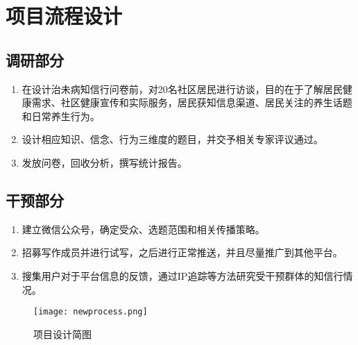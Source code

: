 \section{项目流程设计}
\subsection{调研部分}
\begin{enumerate}
    \item 在设计治未病知信行问卷前，对20名社区居民进行访谈，目的在于了解居民健康需求、社区健康宣传和实际服务，居民获知信息渠道、居民关注的养生话题和日常养生行为。
    \item 设计相应知识、信念、行为三维度的题目，并交予相关专家评议通过。
    \item 发放问卷，回收分析，撰写统计报告。
\end{enumerate}
\subsection{干预部分}
\begin{enumerate}
    \item 建立微信公众号，确定受众、选题范围和相关传播策略。
    \item 招募写作成员并进行试写，之后进行正常推送，并且尽量推广到其他平台。
    \item 搜集用户对于平台信息的反馈，通过IP追踪等方法研究受干预群体的知信行情况。
\end{enumerate}
\begin{figure}[th]
	\texttt{[image: newprocess.png]}
	\centering
	\caption{项目设计简图}
\end{figure}